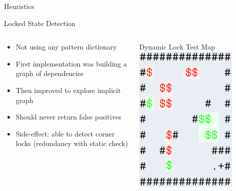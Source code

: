 \documentclass{beamer}
\begin{document}
\begin{frame}{Heuristics}
  
\end{frame}

\begin{frame}{Locked State Detection}
  \begin{columns}
    \begin{column}{.5\textwidth}
      \begin{itemize}
        \item Not using any pattern dictionary
        \item First implementation was building a graph of dependencies
        \item Then improved to explore implicit graph
        \item Should never return false positives
        \item Side-effect: able to detect corner locks (redundancy with static check)
      \end{itemize}
    \end{column}
    \begin{column}{.5\textwidth}
      \begin{block}{Dynamic Lock Test Map}
        \centering
        \includegraphics[width=0.8\textwidth]{dynamic.png}
      \end{block}
    \end{column}
  \end{columns}

\end{frame}
\end{document}
